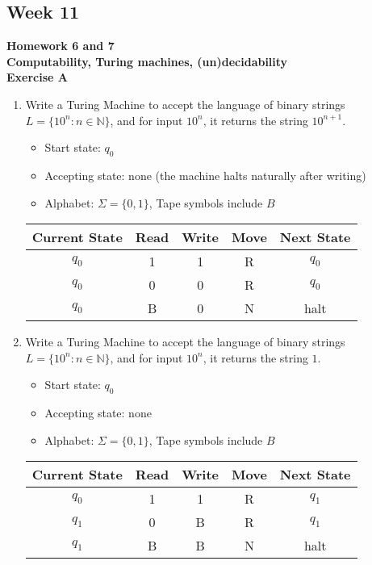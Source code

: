 \documentclass{article}
\theoremstyle{theorem}
\theoremstyle{definition}
\theoremstyle{remark}
\begin{document}
\subsection{Week 11}
\textbf{Homework 6 and 7}\\
\textbf {Computability, Turing machines, (un)decidability}\\
\textbf{Exercise A}
\begin{enumerate}
\item Write a Turing Machine to accept the language of binary strings \( L = \{10^n : n \in \mathbb{N} \} \), and for input \( 10^n \), it returns the string \( 10^{n+1} \).
\begin{itemize}
  \item Start state: \( q_0 \)
  \item Accepting state: none (the machine halts naturally after writing)
  \item Alphabet: \( \Sigma = \{0,1\} \), Tape symbols include \( B \)
\end{itemize}

\begin{center}
\begin{tabular}{|c|c|c|c|c|}
\hline
Current State & Read & Write & Move & Next State \\
\hline
$q_0$ & 1 & 1 & R & $q_0$ \\
$q_0$ & 0 & 0 & R & $q_0$ \\
$q_0$ & B & 0 & N & halt \\
\hline
\end{tabular}
\end{center}

\item Write a Turing Machine to accept the language of binary strings \( L = \{10^n : n \in \mathbb{N} \} \), and for input \( 10^n \), it returns the string \( 1 \).
\begin{itemize}
  \item Start state: \( q_0 \)
  \item Accepting state: none
  \item Alphabet: \( \Sigma = \{0,1\} \), Tape symbols include \( B \)
\end{itemize}

\begin{center}
\begin{tabular}{|c|c|c|c|c|}
\hline
Current State & Read & Write & Move & Next State \\
\hline
$q_0$ & 1 & 1 & R & $q_1$ \\
$q_1$ & 0 & B & R & $q_1$ \\
$q_1$ & B & B & N & halt \\
\hline
\end{tabular}
\end{center}


\end{enumerate}
\end{document}
